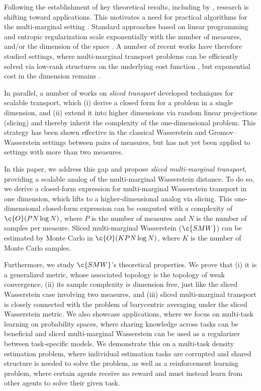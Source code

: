 \documentclass{article}
\begin{document}
Following the establishment of key theoretical results, including by \textcite{gangbo,journals/siamma/AguehC11, Pass2014MultimarginalOT}, research is shifting toward applications. This motivates a need for practical algorithms for the multi-marginal setting \cite{mw_compl}. 
Standard approaches based on linear programming and entropic regularization scale exponentially with the number of measures, and/or the dimension of the space \cite{benamou:hal-01096124, accmmot}. 
A number of recent works have therefore studied settings, where multi-marginal transport problems can be efficiently solved via low-rank structures on the underlying cost function \cite{altschuler_mm}, but exponential cost in the dimension remains \cite{altschulernpbary, altschuler_mm_np}. 


In parallel, a number of works on \emph{sliced transport} \cite{bonnottee} developed techniques for scalable transport, which (i) derive a closed form for a problem in a single dimension, and (ii) extend it into higher dimensions via random linear projections (slicing) and thereby inherit the complexity of the one-dimensional problem.
This strategy has been shown effective in the classical Wasserstein \cite{bonnottee,bonneel, gensliced, distributionalsliced, maxsliced, orthsliced} and Gromov--Wasserstein \cite{sliced_gw} settings between pairs of measures, but has not yet been applied to settings with more than two measures.


In this paper, we address this gap and propose \emph{sliced multi-marginal transport}, providing a scalable analog of the multi-marginal Wasserstein distance.
To do so, we derive a closed-form expression for multi-marginal Wasserstein transport in one dimension, which lifts to a higher-dimensional analog via slicing. 
This one-dimensional closed-form expression can be computed with a complexity of $\c{O}(PN\log N)$, where $P$ is the number of measures and $N$ is the number of samples per measure. 
Sliced multi-marginal Wasserstein ($\c{SMW}$) can be estimated by Monte Carlo in $\c{O}(KPN\log N)$, where $K$ is the number of Monte Carlo samples. 

Furthermore, we study $\c{SMW}$'s theoretical properties.
We prove that (i) it is a generalized metric, whose associated topology is the topology of weak convergence, (ii) its sample complexity is dimension free, just like the sliced Wasserstein case involving two measures, and (iii) sliced multi-marginal transport is closely connected with the problem of barycentric averaging under the sliced Wasserstein metric. 
%
We also showcase applications, where we focus on multi-task learning on probability spaces, where sharing knowledge across tasks can be beneficial and sliced multi-marginal Wasserstein can be used as a regularizer between task-specific models. 
We demonstrate this on a multi-task density estimation problem, where individual estimation tasks are corrupted and shared structure is needed to solve the problem, as well as a reinforcement learning problem, where certain agents receive no reward and must instead learn from other agents to solve their given task.
\end{document}
